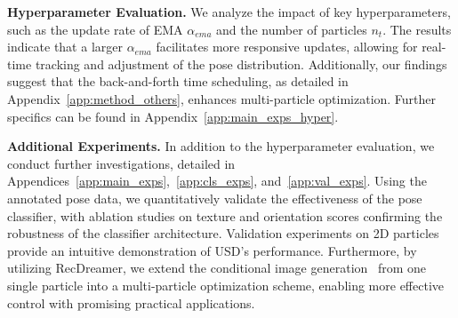 \textbf{Hyperparameter Evaluation.} We analyze the impact of key hyperparameters, such as the update rate of EMA $\alpha_{ema}$ and the number of particles $n_t$. The results indicate that a larger $\alpha_{ema}$ facilitates more responsive updates, allowing for real-time tracking and adjustment of the pose distribution. Additionally, our findings suggest that the back-and-forth time scheduling, as detailed in Appendix~\ref{app:method_others}, enhances multi-particle optimization. Further specifics can be found in Appendix~\ref{app:main_exps_hyper}.

\textbf{Additional Experiments.} In addition to the hyperparameter evaluation, we conduct further investigations, detailed in Appendices~\ref{app:main_exps},~\ref{app:cls_exps}, and~\ref{app:val_exps}. Using the annotated pose data, we quantitatively validate the effectiveness of the pose classifier, with ablation studies on texture and orientation scores confirming the robustness of the classifier architecture. Validation experiments on 2D particles provide an intuitive demonstration of USD's performance. Furthermore, by utilizing RecDreamer, we extend the conditional image generation~\citep{graikos2022diffusion} from one single particle into a multi-particle optimization scheme, enabling more effective control with promising practical applications.












